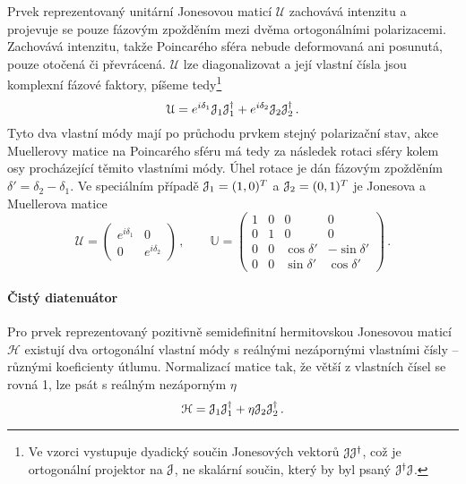 Prvek reprezentovaný unitární Jonesovou maticí $\mathcal{U}$ zachovává intenzitu a projevuje se pouze fázovým zpožděním mezi dvěma ortogonálními polarizacemi.
Zachovává intenzitu, takže Poincarého sféra nebude deformovaná ani posunutá, pouze otočená či převrácená.
$\mathcal{U}$ lze diagonalizovat a její vlastní čísla jsou komplexní fázové faktory, píšeme tedy\footnote{Ve vzorci vystupuje dyadický součin Jonesových vektorů $\mathcal{J}\mathcal{J}^\dagger$, což je ortogonální projektor na $\mathcal{J}$, ne skalární součin, který by byl psaný $\mathcal{J}^\dagger \mathcal{J}$.}
\begin{equation}
    \mathcal{U}=e^{i\delta_1} \mathcal{J}_1 \mathcal{J}_1^\dagger + e^{i\delta_2} \mathcal{J}_2 \mathcal{J}_2^\dagger\,.
\end{equation}
Tyto dva vlastní módy mají po průchodu prvkem stejný polarizační stav, akce Muellerovy matice na Poincarého sféru má tedy za následek rotaci sféry kolem osy procházející těmito vlastními módy.
Úhel rotace je dán fázovým zpožděním $\delta'=\delta_2-\delta_1$.
Ve speciálním případě $\mathcal{J}_1=(1,0)^T$ a $\mathcal{J}_2=(0,1)^T$ je Jonesova a Muellerova matice
\begin{equation}
\label{eqn:cisty-retarder}
    \mathcal{U}=\begin{pmatrix}
        e^{i\delta_1} & 0 \\ 0 & e^{i\delta_2}
        \end{pmatrix} \,, \qquad
    \mathbb{U}=\begin{pmatrix}
        1 & 0 & 0 & 0 \\ 0 & 1 & 0 & 0 \\
        0 & 0 & \cos\delta' & -\sin\delta' \\ 0 & 0 & \sin\delta' & \cos\delta'
        \end{pmatrix} \,.
\end{equation}

\paragraph{Čistý diatenuátor}

Pro prvek reprezentovaný pozitivně semidefinitní hermitovskou Jonesovou maticí $\mathcal{H}$ existují dva ortogonální vlastní módy s reálnými nezápornými vlastními čísly -- různými koeficienty útlumu.
Normalizací matice tak, že větší z vlastních čísel se rovná 1, lze psát s reálným nezáporným $\eta$
\begin{equation}
    \mathcal{H}=\mathcal{J}_1 \mathcal{J}_1^\dagger + \eta \mathcal{J}_2 \mathcal{J}_2^\dagger \,.
\end{equation}


